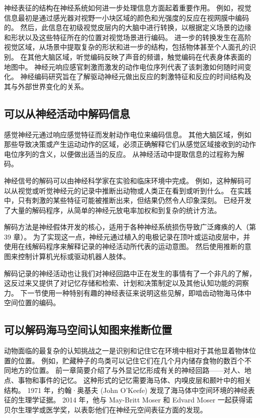 神经表征的结构在神经系统如何进一步处理信息方面起着重要作用。 例如，视觉信息最初是通过感光器对视野一小块区域的颜色和光强度的反应在视网膜中编码的。 然后，此信息在初级视觉皮层内的大脑中进行转换，以根据定义场景的边缘和形状以及这些特征所在的位置对视觉场景进行编码。 进一步的转换发生在高阶视觉区域，从场景中提取复杂的形状和进一步的结构，包括物体甚至个人面孔的识别。 在其他大脑区域，听觉编码反映了声音的频谱，触觉编码在代表身体表面的地图中。 神经元响应感官刺激而激发的动作电位序列代表了该刺激如何随时间变化。 神经编码研究旨在了解驱动神经元做出反应的刺激特征和反应的时间结构及其与外部世界变化的关系。


\subsection{可以从神经活动中解码信息}
感觉神经元通过响应感觉特征而发射动作电位来编码信息。 其他大脑区域，例如那些导致决策或产生运动动作的区域，必须正确解释它们从感觉区域接收到的动作电位序列的含义，以便做出适当的反应。 从神经活动中提取信息的过程称为解码。

神经信号的解码可以由神经科学家在实验和临床环境中完成。 例如，这种解码可以从视觉或听觉神经元的记录中推断出动物或人类正在看到或听到什么。 在实践中，只有刺激的某些特征可能被推断出来，但结果仍然令人印象深刻。 已经开发了大量的解码程序，从简单的神经元放电率加权和到复杂的统计方法。

解码方法是神经假体开发的核心，适用于各种神经系统损伤导致广泛瘫痪的人（第 39 章）。 为了实现这一点，神经元通过植入的电极记录在顶叶或运动皮层中，并使用在线解码程序来解释记录的神经活动所代表的运动意图。 然后使用推断的意图来控制计算机光标或驱动机器人肢体。

解码记录的神经活动也让我们对神经回路中正在发生的事情有了一个非凡的了解，这反过来又提供了对记忆存储和检索、计划和决策制定以及其他认知功能的洞察力。 下一节使用一种特别有趣的神经表征来说明这些见解，即啮齿动物海马体中空间位置的编码。

\subsection{可以解码海马空间认知图来推断位置}
动物面临的最复杂的认知挑战之一是识别和记住它在环境中相对于其他显着物体位置的位置。 例如，贮藏种子的鸟类可以记住它们在几个月内储存食物的数百个不同地方的位置。 前一章简要介绍了与外显记忆形成有关的神经回路——对人、地点、事物和事件的记忆。 这种形式的记忆需要海马体、内嗅皮层和颞叶中的相关结构。 1971 年，约翰·奥基夫 (John O’Keefe) 发现了海马体中空间环境的神经表征的生理学证据。 2014 年，他与 May-Britt Moser 和 Edvard Moser 一起获得诺贝尔生理学或医学奖，以表彰他们在神经元空间表征方面的发现。

